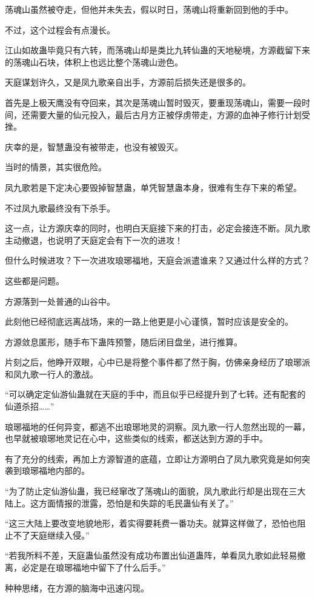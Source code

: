\begin{this_body}
荡魂山虽然被夺走，但他并未失去，假以时日，荡魂山将重新回到他的手中。

不过，这个过程会有点漫长。

江山如故蛊毕竟只有六转，而荡魂山却是类比九转仙蛊的天地秘境，方源截留下来的荡魂山石块，体积上也远比整个荡魂山逊色。

天庭谋划许久，又是凤九歌亲自出手，方源前后损失还是很多的。

首先是上极天鹰没有夺回来，其次是荡魂山暂时毁灭，要重现荡魂山，需要一段时间，还需要大量的仙元投入，最后古月方正被俘虏带走，方源的血神子修行计划受挫。

庆幸的是，智慧蛊没有被带走，也没有被毁灭。

当时的情景，其实很危险。

凤九歌若是下定决心要毁掉智慧蛊，单凭智慧蛊本身，很难有生存下来的希望。

不过凤九歌最终没有下杀手。

这一点，让方源庆幸的同时，也明白天庭接下来的打击，必定会接连不断。凤九歌主动撤退，也说明了天庭定会有下一次的进攻！

但什么时候进攻？下一次进攻琅琊福地，天庭会派遣谁来？又通过什么样的方式？

这些都是问题。

方源落到一处普通的山谷中。

此刻他已经彻底远离战场，来的一路上他更是小心谨慎，暂时应该是安全的。

方源敛息匿形，随手布下蛊阵预警，随后闭目盘坐，进行推算。

片刻之后，他睁开双眼，心中已是将整个事件都了然于胸，仿佛亲身经历了琅琊派和凤九歌一行人的激战。

“可以确定定仙游仙蛊就在天庭的手中，而且似乎已经提升到了七转。还有配套的仙道杀招……”

琅琊福地的任何异变，都逃不出琅琊地灵的洞察。凤九歌一行人忽然出现的一幕，也早就被琅琊地灵记在心中，这些类似的线索，都送达到方源的手中。

有了充分的线索，再加上方源智道的底蕴，立即让方源明白了凤九歌究竟是如何突袭到琅琊福地内部的。

“为了防止定仙游仙蛊，我已经窜改了荡魂山的面貌，凤九歌此行却是出现在三大陆上。这方面情报的泄露，恐怕是和失踪的毛民蛊仙有关了。”

“这三大陆上要改变地貌地形，着实得要耗费一番功夫。就算这样做了，恐怕也阻止不了天庭继续入侵。”

“若我所料不差，天庭蛊仙虽然没有成功布置出仙道蛊阵，单看凤九歌如此轻易撤离，必定是在琅琊福地中留下了什么后手。”

种种思绪，在方源的脑海中迅速闪现。


\end{this_body}
